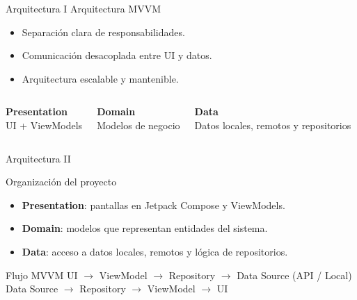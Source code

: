 \begin{frame}{Arquitectura I}
    \vspace{-0.9cm}
    \centering
    {\Large\color{BrownDeep} Arquitectura MVVM}
    \vspace{0.2cm}

    \begin{itemize}
        \item Separación clara de responsabilidades.
        \item Comunicación desacoplada entre UI y datos.
        \item Arquitectura escalable y mantenible.
    \end{itemize}

    \vspace{0.2cm}

    \begin{columns}[T,onlytextwidth]
        \centering
        \textbf{Presentation}\\
        UI + ViewModels

        \centering
        \textbf{Domain}\\
        Modelos de negocio

        \centering
        \textbf{Data}\\
        Datos locales, remotos y repositorios
    \end{columns}
\end{frame}

\begin{frame}{Arquitectura II}
    \vspace{-0.9cm}
    \centering

    {\Large\color{BrownDeep} Organización del proyecto}

    \vspace{0.2cm}

    \begin{itemize}
        \item \textbf{Presentation}: pantallas en Jetpack Compose y ViewModels.
        \item \textbf{Domain}: modelos que representan entidades del sistema.
        \item \textbf{Data}: acceso a datos locales, remotos y lógica de repositorios.
    \end{itemize}

    \vspace{0.2cm}

    \begin{block}{Flujo MVVM}
        UI $\rightarrow$ ViewModel $\rightarrow$ Repository $\rightarrow$ Data Source (API / Local) \\
        Data Source $\rightarrow$ Repository $\rightarrow$ ViewModel $\rightarrow$ UI
    \end{block}
\end{frame}

